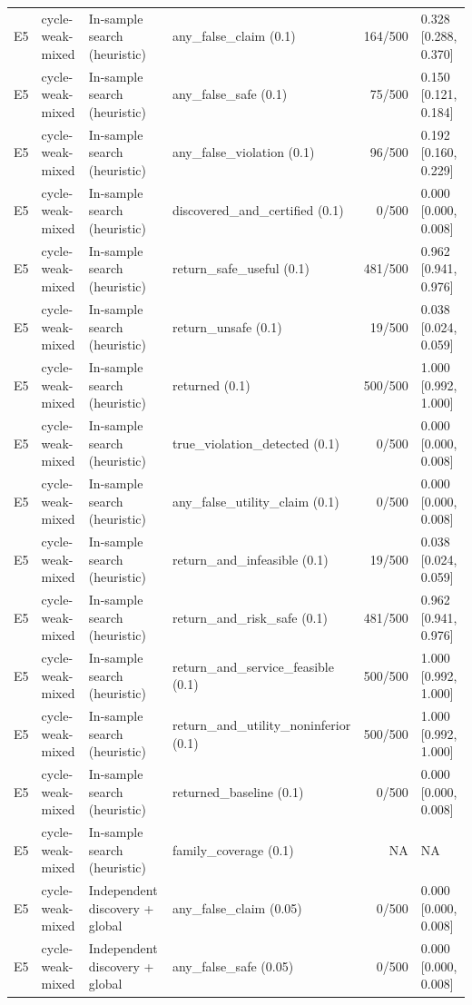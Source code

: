\begin{longtable}{p{.04\linewidth}p{.18\linewidth}p{.19\linewidth}p{.16\linewidth}r p{.21\linewidth}}
E5 & cycle-weak-mixed & In-sample search (heuristic) & any\_false\_claim (0.1) & 164/500 & 0.328 [0.288, 0.370]\\
E5 & cycle-weak-mixed & In-sample search (heuristic) & any\_false\_safe (0.1) & 75/500 & 0.150 [0.121, 0.184]\\
E5 & cycle-weak-mixed & In-sample search (heuristic) & any\_false\_violation (0.1) & 96/500 & 0.192 [0.160, 0.229]\\
E5 & cycle-weak-mixed & In-sample search (heuristic) & discovered\_and\_certified (0.1) & 0/500 & 0.000 [0.000, 0.008]\\
E5 & cycle-weak-mixed & In-sample search (heuristic) & return\_safe\_useful (0.1) & 481/500 & 0.962 [0.941, 0.976]\\
E5 & cycle-weak-mixed & In-sample search (heuristic) & return\_unsafe (0.1) & 19/500 & 0.038 [0.024, 0.059]\\
E5 & cycle-weak-mixed & In-sample search (heuristic) & returned (0.1) & 500/500 & 1.000 [0.992, 1.000]\\
E5 & cycle-weak-mixed & In-sample search (heuristic) & true\_violation\_detected (0.1) & 0/500 & 0.000 [0.000, 0.008]\\
E5 & cycle-weak-mixed & In-sample search (heuristic) & any\_false\_utility\_claim (0.1) & 0/500 & 0.000 [0.000, 0.008]\\
E5 & cycle-weak-mixed & In-sample search (heuristic) & return\_and\_infeasible (0.1) & 19/500 & 0.038 [0.024, 0.059]\\
E5 & cycle-weak-mixed & In-sample search (heuristic) & return\_and\_risk\_safe (0.1) & 481/500 & 0.962 [0.941, 0.976]\\
E5 & cycle-weak-mixed & In-sample search (heuristic) & return\_and\_service\_feasible (0.1) & 500/500 & 1.000 [0.992, 1.000]\\
E5 & cycle-weak-mixed & In-sample search (heuristic) & return\_and\_utility\_noninferior (0.1) & 500/500 & 1.000 [0.992, 1.000]\\
E5 & cycle-weak-mixed & In-sample search (heuristic) & returned\_baseline (0.1) & 0/500 & 0.000 [0.000, 0.008]\\
E5 & cycle-weak-mixed & In-sample search (heuristic) & family\_coverage (0.1) & NA & NA\\
E5 & cycle-weak-mixed & Independent discovery + global & any\_false\_claim (0.05) & 0/500 & 0.000 [0.000, 0.008]\\
E5 & cycle-weak-mixed & Independent discovery + global & any\_false\_safe (0.05) & 0/500 & 0.000 [0.000, 0.008]\\

\end{longtable}
